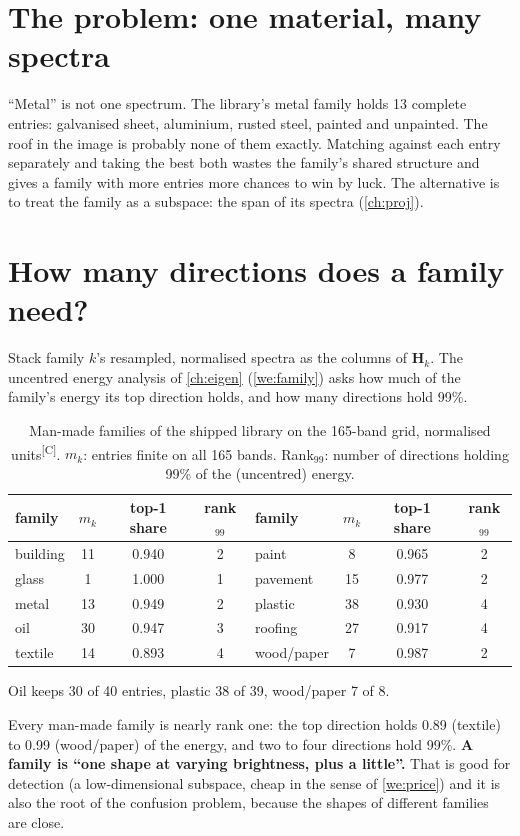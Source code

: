 \documentclass[11pt,a4paper,oneside,openany]{book}
\newcommand{\B}[1]{{\symbf{#1}}}
\newcommand{\B}[1]{{\bm{#1}}}
\newcommand{\comp}{\textsuperscript{\textsf{\scriptsize[C]}}}
\newcommand{\mH}{\B{H}}
\begin{document}
\section{The problem: one material, many spectra}

``Metal'' is not one spectrum. The library's metal family holds 13 complete entries: galvanised sheet, aluminium, rusted steel, painted and
unpainted. The roof in the image is probably none of them exactly. Matching against each entry separately and taking the best both wastes
the family's shared structure and gives a family with more entries more chances to win by luck. The alternative is to treat the family as a
subspace: the span of its spectra (\cref{ch:proj}).

\section{How many directions does a family need?}

Stack family $k$'s resampled, normalised spectra as the columns of $\mH_k$. The uncentred energy analysis of \cref{ch:eigen} (\cref{we:family})
asks how much of the family's energy its top direction holds, and how many directions hold 99\%.

\begin{table}[ht]
\centering\small
\caption{Man-made families of the shipped library on the 165-band grid, normalised units\comp. $m_k$: entries finite on all 165 bands. Rank$_{99}$:
number of directions holding 99\% of the (uncentred) energy.}
\label{tab:rank}
\begin{tabular}{@{}lccc@{\qquad}lccc@{}}
\toprule
family & $m_k$ & top-1 share & rank$_{99}$ & family & $m_k$ & top-1 share & rank$_{99}$\\
\midrule
building & 11 & 0.940 & 2 & paint & 8 & 0.965 & 2\\
glass & 1 & 1.000 & 1 & pavement & 15 & 0.977 & 2\\
metal & 13 & 0.949 & 2 & plastic & 38 & 0.930 & 4\\
oil & 30 & 0.947 & 3 & roofing & 27 & 0.917 & 4\\
textile & 14 & 0.893 & 4 & wood/paper & 7 & 0.987 & 2\\
\bottomrule
\end{tabular}
\par\smallskip\footnotesize Oil keeps 30 of 40 entries, plastic 38 of 39, wood/paper 7 of 8.
\end{table}

Every man-made family is nearly rank one: the top direction holds 0.89 (textile) to 0.99 (wood/paper) of the energy, and two to four
directions hold 99\%. \textbf{A family is ``one shape at varying brightness, plus a little''.} That is good for detection (a low-dimensional
subspace, cheap in the sense of \cref{we:price}) and it is also the root of the confusion problem, because the shapes of different families are
close.
\end{document}
